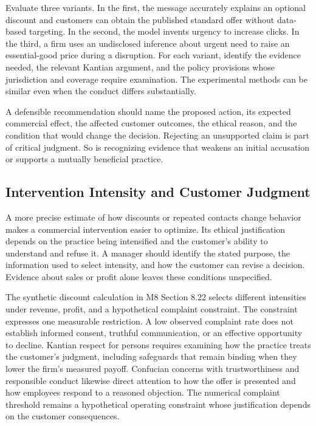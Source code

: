 Evaluate three variants. In the first, the message accurately explains
an optional discount and customers can obtain the published standard
offer without data-based targeting. In the second, the model invents
urgency to increase clicks. In the third, a firm uses an undisclosed
inference about urgent need to raise an essential-good price during a
disruption. For each variant, identify the evidence needed, the relevant
Kantian argument, and the policy provisions whose jurisdiction and
coverage require examination. The experimental methods can be similar
even when the conduct differs substantially.

A defensible recommendation should name the proposed action, its
expected commercial effect, the affected customer outcomes, the ethical
reason, and the condition that would change the decision. Rejecting an
unsupported claim is part of critical judgment. So is recognizing
evidence that weakens an initial accusation or supports a mutually
beneficial practice.

\hypertarget{M09-intervention-intensity-and-customer-judgment}{%
\subsection{Intervention Intensity and Customer
Judgment}\label{M09-intervention-intensity-and-customer-judgment}}

\noindent \noindent A more precise estimate of how discounts or repeated contacts
change behavior makes a commercial intervention easier to optimize. Its
ethical justification depends on the practice being intensified and the
customer's ability to understand and refuse it. A manager should
identify the stated purpose, the information used to select intensity,
and how the customer can revise a decision. Evidence about sales or
profit alone leaves these conditions unspecified.

The synthetic discount calculation in M8 Section 8.22 selects different
intensities under revenue, profit, and a hypothetical complaint
constraint. The constraint expresses one measurable restriction. A low
observed complaint rate does not establish informed consent, truthful
communication, or an effective opportunity to decline. Kantian respect
for persons requires examining how the practice treats the customer's
judgment, including safeguards that remain binding when they lower the
firm's measured payoff. Confucian concerns with trustworthiness and
responsible conduct likewise direct attention to how the offer is
presented and how employees respond to a reasoned objection. The
numerical complaint threshold remains a hypothetical operating
constraint whose justification depends on the customer consequences.

